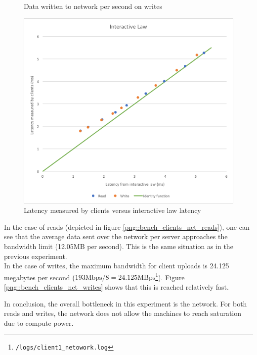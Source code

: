 \documentclass[11pt,a4paper]{article}
\begin{document}
\begin{figure}[!h]
\begin{minipage}[b]{.45\textwidth}
        \caption{Data written to network per second on writes}
        \label{png::bench_clients_net_writes}
    \end{minipage}
    \begin{minipage}[b]{.45\textwidth}
        \vspace{1cm}
        \centering
        \includegraphics[width=\textwidth]{processing/graphics/bench_clients_inter_law.png}
        \caption{Latency measured by clients versus interactive law latency}
        \label{png::bench_clients_inter_law}
    \end{minipage}
\end{figure}

In the case of reads (depicted in figure \ref{png::bench_clients_net_reads}), one can see that the average data sent over the network per server approaches the bandwidth limit (12.05MB per second). This is the same situation as in the previous experiment.\\
In the case of writes, the maximum bandwidth for client uploads is 24.125 megabytes per second ($193\text{Mbps}/8=24.125\text{MBps}$\footnote{\texttt{/logs/client1_netowork.log}}). Figure \ref{png::bench_clients_net_writes} shows that this is reached relatively fast.

In conclusion, the overall bottleneck in this experiment is the network. For both reads and writes, the network does not allow the machines to reach saturation due to compute power.
\end{document}
